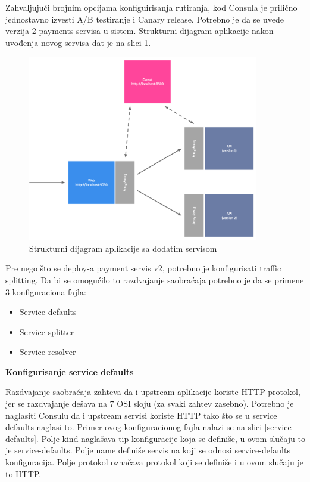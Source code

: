 \documentclass[a4paper,12pt]{report}
\begin{document}
Zahvaljujući brojnim opcijama konfiguirisanja rutiranja, kod Consula je prilično jednostavno izvesti A/B testiranje i Canary release. Potrebno je da se uvede verzija 2 payments servisa u sistem. Strukturni dijagram aplikacije nakon uvođenja novog servisa dat je na slici \ref{fig:structure-diagram-v2}. \newline

\begin{figure}[h]
    \centering
    \includegraphics[width=0.9\textwidth]{app_structure_diagram}
    \caption{Strukturni dijagram aplikacije sa dodatim servisom}
    \label{fig:structure-diagram-v2}
\end{figure} 

Pre nego što se deploy-a payment servis v2, potrebno je konfigurisati traffic splitting. Da bi se omogućilo to razdvajanje saobraćaja potrebno je da se primene 3 konfiguraciona fajla: 

\begin{itemize}
	\item Service defaults
	\item Service splitter 
	\item Service resolver
\end{itemize}

\textbf{Konfigurisanje service defaults}\newline

Razdvajanje saobraćaja zahteva da i upstream aplikacije koriste HTTP protokol, jer se razdvajanje dešava na 7 OSI sloju (za svaki zahtev zasebno). Potrebno je naglasiti Consulu da i upstream servisi koriste HTTP tako što se u service defaults naglasi to. Primer ovog konfiguracionog fajla nalazi se na slici \ref{service-defaults}. Polje kind naglašava tip konfiguracije koja se definiše, u ovom slučaju to je service-defaults. Polje name definiše servis na koji se odnosi service-defaults konfiguracija. Polje protokol označava protokol koji se definiše i u ovom slučaju je to HTTP. \newline
\end{document}
